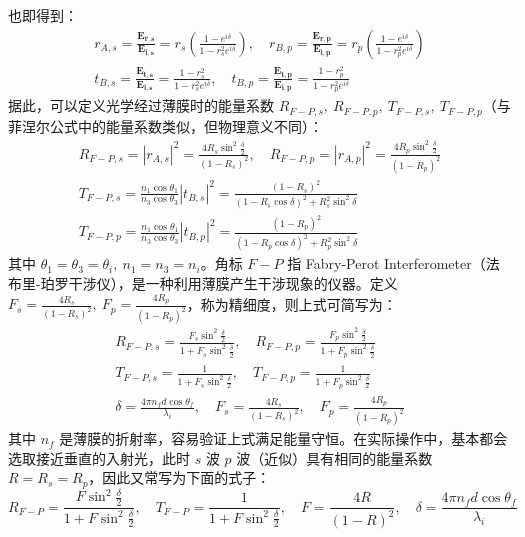 \documentclass[UTF8]{report}
\theoremstyle{MyLineTheoremStyle} %
\theoremstyle{MyBlockTheoremStyle} %
\theoremstyle{MySubsubsectionStyle} %
\begin{document}
也即得到：
\begin{gather}
    r_{A,s}= \frac{\boldsymbol{E_{r,s}}}{\boldsymbol{E_{i,s}}} = r_s \left( \frac{1 - e^{i \delta}}{1 - r_s^2 e^{i \delta}} \right),\quad 
    r_{B,p} = \frac{\boldsymbol{E_{r,p}}}{\boldsymbol{E_{i,p}}} = r_p \left( \frac{1 - e^{i \delta}}{1 - r_p^2 e^{i \delta}} \right) \\
    t_{B,s} = \frac{\boldsymbol{E_{t,s}}}{\boldsymbol{E_{i,s}}} = \frac{1 - r_s^2}{1 - r_s^2 e^{i \delta}} ,\quad
    t_{B,p} = \frac{\boldsymbol{E_{t,p}}}{\boldsymbol{E_{i,p}}} = \frac{1 - r_p^2}{1 - r_p^2 e^{i \delta}}
\end{gather}
据此，可以定义光学经过薄膜时的能量系数 $R_{F-P,s},\ R_{F-P,p},\  T_{F-P,s},\  T_{F-P,p}$（与菲涅尔公式中的能量系数类似，但物理意义不同）：
\begin{gather}
    R_{F-P,s} = |r_{A,s}|^2 = \frac{4 R_s \sin^2 \frac{\delta}{2}}{(1 - R_s)^2}, \quad 
    R_{F-P,p} = |r_{A,p}|^2 = \frac{4 R_p \sin^2 \frac{\delta}{2}}{(1 - R_p)^2} \\ 
    T_{F-P,s}= \frac{n_1 \cos \theta_1}{n_3 \cos \theta_3} |t_{B,s}|^2 = \frac{(1 - R_s)^2}{ (1 - R_s\cos \delta)^2 + R_s^2 \sin^2 \delta} \\
    T_{F-P,p} = \frac{n_1 \cos \theta_1}{n_3 \cos \theta_3} |t_{B,p}|^2 = \frac{(1 - R_p)^2}{ (1 - R_p\cos \delta)^2 + R_p^2 \sin^2 \delta}
\end{gather}
其中 $\theta_1 = \theta_3 = \theta_i,\ n_1 = n_3 = n_i$。角标 $F-P$ 指 Fabry-Perot Interferometer（法布里-珀罗干涉仪），是一种利用薄膜产生干涉现象的仪器。定义 $F_s = \frac{4R_s}{(1 - R_s)^2},\ F_p = \frac{4R_p}{(1 - R_p)^2}$，称为精细度，则上式可简写为：
\begin{gather}
    R_{F-P, s} = \frac{F_s \sin^2 \frac{\delta}{2}}{1 + F_s \sin^2 \frac{\delta}{2}},\quad R_{F-P, p} = \frac{F_p \sin^2 \frac{\delta}{2}}{1 + F_p \sin^2 \frac{\delta}{2}} \\
    T_{F-P, s} = \frac{1}{1 + F_s \sin^2 \frac{\delta}{2}},\quad T_{F-P, p} = \frac{1}{1 + F_p \sin^2 \frac{\delta}{2}}\\ 
    \delta = \frac{4 \pi n_f d \cos \theta_f}{\lambda_i},\quad F_s = \frac{4R_s}{(1 - R_s)^2},\quad F_p = \frac{4R_p}{(1 - R_p)^2}
\end{gather}
其中 $n_f$ 是薄膜的折射率，容易验证上式满足能量守恒。在实际操作中，基本都会选取接近垂直的入射光，此时 $s$ 波 $p$ 波（近似）具有相同的能量系数 $R = R_s = R_p$，因此又常写为下面的式子：
\begin{equation}
    R_{F-P} = \frac{F \sin^2 \frac{\delta}{2}}{1 + F \sin^2 \frac{\delta}{2}},\quad T_{F-P} = \frac{1}{1 + F \sin^2 \frac{\delta}{2}},\quad F = \frac{4R}{(1 - R)^2},\quad \delta = \frac{4 \pi n_f d \cos \theta_f}{\lambda_i}
\end{equation}
\end{document}
